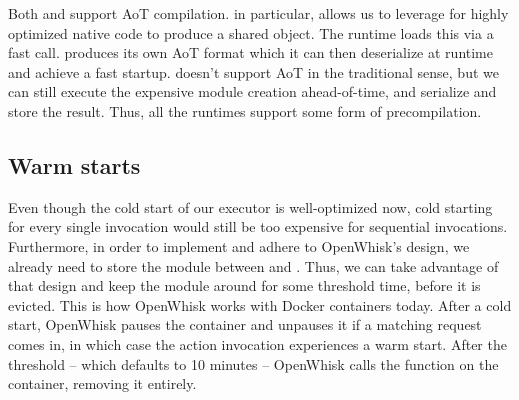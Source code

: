 Both  and  support AoT compilation.  in particular, allows us to leverage  for highly optimized native code to produce a shared object. The runtime loads this via a fast  call.  produces its own AoT format which it can then deserialize at runtime and achieve a fast startup.  doesn't support AoT in the traditional sense, but we can still execute the expensive module creation ahead-of-time, and serialize and store the result. Thus, all the runtimes support some form of precompilation.

\subsection{Warm starts}

Even though the cold start of our executor is well-optimized now, cold starting for every single invocation would still be too expensive for sequential invocations. Furthermore, in order to implement and adhere to OpenWhisk's design, we already need to store the module between  and . Thus, we can take advantage of that design and keep the module around for some threshold time, before it is evicted. This is how OpenWhisk works with Docker containers today. After a cold start, OpenWhisk pauses the container and unpauses it if a matching request comes in, in which case the action invocation experiences a warm start. After the threshold -- which defaults to 10 minutes -- OpenWhisk calls the  function on the container, removing it entirely.

